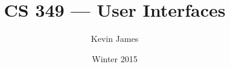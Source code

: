 \documentclass[12pt]{article}
\begin{document}
\title{CS 349 --- User Interfaces}
\author{Kevin James}
\date{\vspace{-2ex}Winter 2015}
\maketitle\HRule

\tableofcontents
\newpage

\section{}
\end{document}
